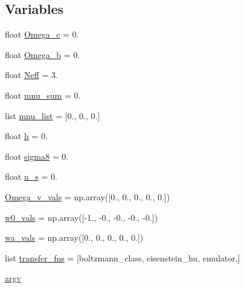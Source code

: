 \subsection*{Variables}
\begin{DoxyCompactItemize}
\item 
float \mbox{\hyperlink{namespaceccl__test__power_aaf9d8b7db6570b06c0f0c3453991271f}{Omega\+\_\+c}} = 0.
\item 
float \mbox{\hyperlink{namespaceccl__test__power_ab5d61f296807cf09df592a9c06f8ec7c}{Omega\+\_\+b}} = 0.
\item 
float \mbox{\hyperlink{namespaceccl__test__power_a6b35ce94d1e19c7a920a69f32a19d220}{Neff}} = 3.
\item 
float \mbox{\hyperlink{namespaceccl__test__power_a8041706a448167dfed239ef392310710}{mnu\+\_\+sum}} = 0.
\item 
list \mbox{\hyperlink{namespaceccl__test__power_abb3b81930a5b96dad621f66bd6931c78}{mnu\+\_\+list}} = \mbox{[}0., 0., 0.\mbox{]}
\item 
float \mbox{\hyperlink{namespaceccl__test__power_a87063e26755d0fd20dc7b85fe40181f7}{h}} = 0.
\item 
float \mbox{\hyperlink{namespaceccl__test__power_a1db9a0e452c2ccc904f3a1828f1143a8}{sigma8}} = 0.
\item 
float \mbox{\hyperlink{namespaceccl__test__power_a506d59dad2f002ac2695a23c3927e746}{n\+\_\+s}} = 0.
\item 
\mbox{\hyperlink{namespaceccl__test__power_a21350279041ff7f791d335e70a395c6d}{Omega\+\_\+v\+\_\+vals}} = np.\+array(\mbox{[}0., 0., 0., 0., 0.\mbox{]})
\item 
\mbox{\hyperlink{namespaceccl__test__power_aea53fa09107f79b1ea572fc722716147}{w0\+\_\+vals}} = np.\+array(\mbox{[}-\/1., -\/0., -\/0., -\/0., -\/0.\mbox{]})
\item 
\mbox{\hyperlink{namespaceccl__test__power_af24a271b345239e7f2d22fd15a615fea}{wa\+\_\+vals}} = np.\+array(\mbox{[}0., 0., 0., 0., 0.\mbox{]})
\item 
list \mbox{\hyperlink{namespaceccl__test__power_a540d8a33297c93fd4d595c7007e5e929}{transfer\+\_\+fns}} = \mbox{[}\textquotesingle{}boltzmann\+\_\+class\textquotesingle{}, \textquotesingle{}eisenstein\+\_\+hu\textquotesingle{}, \textquotesingle{}emulator\textquotesingle{},\mbox{]}
\item 
\mbox{\hyperlink{namespaceccl__test__power_a1b5fdf14c4f06d4a8722a7c41d8dbe1a}{argv}}
\end{DoxyCompactItemize}


